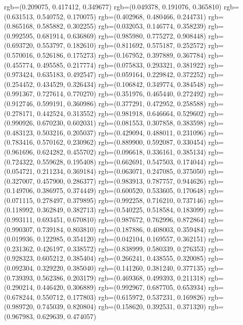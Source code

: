 {{{					rgb=(0.209075, 0.417412, 0.349677)
					rgb=(0.049378, 0.191076, 0.365810)
					rgb=(0.631513, 0.540752, 0.170075)
					rgb=(0.402968, 0.480466, 0.244731)
					rgb=(0.865168, 0.585882, 0.302255)
					rgb=(0.032053, 0.146774, 0.358239)
					rgb=(0.992595, 0.681914, 0.636869)
					rgb=(0.985980, 0.775272, 0.908448)
					rgb=(0.693720, 0.553797, 0.182610)
					rgb=(0.811692, 0.575187, 0.252572)
					rgb=(0.570016, 0.526186, 0.175273)
					rgb=(0.167952, 0.397889, 0.367784)
					rgb=(0.455774, 0.495585, 0.217774)
					rgb=(0.075833, 0.293321, 0.381922)
					rgb=(0.973424, 0.635183, 0.492547)
					rgb=(0.059164, 0.229842, 0.372252)
					rgb=(0.254452, 0.434529, 0.326434)
					rgb=(0.106842, 0.349774, 0.384548)
					rgb=(0.991367, 0.727614, 0.770270)
					rgb=(0.351976, 0.465440, 0.272492)
					rgb=(0.912746, 0.599191, 0.360986)
					rgb=(0.377291, 0.472952, 0.258588)
					rgb=(0.278171, 0.442524, 0.313552)
					rgb=(0.981918, 0.646664, 0.529602)
					rgb=(0.990926, 0.670230, 0.602031)
					rgb=(0.081553, 0.307858, 0.383598)
					rgb=(0.483123, 0.503216, 0.205037)
					rgb=(0.429094, 0.488011, 0.231096)
					rgb=(0.783416, 0.570162, 0.230962)
					rgb=(0.889900, 0.592087, 0.330454)
					rgb=(0.961696, 0.624282, 0.455702)
					rgb=(0.096618, 0.336161, 0.385134)
					rgb=(0.724322, 0.559628, 0.195408)
					rgb=(0.662691, 0.547503, 0.174044)
					rgb=(0.054721, 0.211234, 0.369184)
					rgb=(0.063071, 0.247085, 0.375050)
					rgb=(0.327007, 0.457900, 0.286377)
					rgb=(0.983913, 0.787757, 0.944626)
					rgb=(0.149706, 0.386975, 0.374449)
					rgb=(0.600520, 0.533605, 0.170648)
					rgb=(0.071115, 0.278497, 0.379895)
					rgb=(0.992258, 0.716210, 0.737146)
					rgb=(0.118992, 0.362849, 0.382713)
					rgb=(0.540225, 0.518584, 0.183099)
					rgb=(0.993111, 0.693451, 0.670810)
					rgb=(0.987672, 0.762996, 0.872864)
					rgb=(0.990307, 0.739184, 0.803810)
					rgb=(0.187886, 0.408003, 0.359484)
					rgb=(0.019936, 0.122985, 0.354120)
					rgb=(0.042104, 0.169557, 0.362151)
					rgb=(0.231362, 0.426197, 0.338572)
					rgb=(0.838999, 0.580339, 0.276353)
					rgb=(0.928323, 0.605212, 0.385404)
					rgb=(0.266241, 0.438555, 0.320085)
					rgb=(0.092304, 0.329220, 0.385040)
					rgb=(0.141260, 0.381240, 0.377135)
					rgb=(0.739393, 0.562386, 0.203179)
					rgb=(0.469368, 0.499393, 0.211318)
					rgb=(0.290214, 0.446420, 0.306889)
					rgb=(0.992967, 0.687705, 0.653934)
					rgb=(0.678244, 0.550712, 0.177803)
					rgb=(0.615972, 0.537231, 0.169826)
					rgb=(0.989720, 0.745039, 0.820804)
					rgb=(0.158620, 0.392531, 0.371320)
					rgb=(0.967983, 0.629639, 0.474057)
}}}
